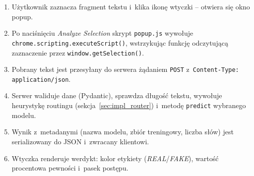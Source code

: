 \documentclass[oneside,polski,logo]{amuthesis}
\begin{document}
\begin{enumerate}
  \item Użytkownik zaznacza fragment tekstu i~klika ikonę wtyczki --
        otwiera się okno popup.
  \item Po naciśnięciu \emph{Analyze Selection} skrypt \texttt{popup.js}
        wywołuje \texttt{chrome.scripting.executeScript()}, wstrzykując
        funkcję odczytującą zaznaczenie przez \texttt{window.getSelection()}.
  \item Pobrany tekst jest przesyłany do serwera żądaniem
        \texttt{POST} z~\texttt{Content-Type: application/json}.
  \item Serwer waliduje dane (Pydantic), sprawdza długość tekstu,
        wywołuje heurystykę routingu (sekcja~\ref{sec:impl_router})
        i~metodę \texttt{predict} wybranego modelu.
  \item Wynik z~metadanymi (nazwa modelu, zbiór treningowy, liczba
        słów) jest serializowany do JSON i~zwracany klientowi.
  \item Wtyczka renderuje werdykt: kolor etykiety (\textit{REAL}/\textit{FAKE}),
        wartość procentowa pewności i~pasek postępu.
\end{enumerate}
\end{document}
